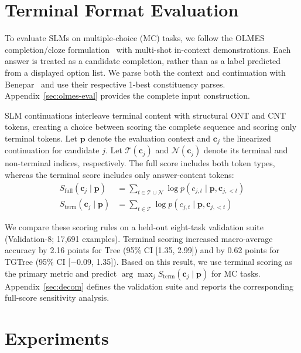 \documentclass[11pt]{article}
\begin{document}
\section{Terminal Format Evaluation}
\label{sec:terminal-format-evaluation}

To evaluate SLMs on multiple-choice (MC) tasks, we follow the OLMES completion/cloze formulation~\cite{gu-etal-2025-olmes} with multi-shot in-context demonstrations.
Each answer is treated as a candidate completion, rather than as a label predicted from a displayed option list.
We parse both the context and continuation with Benepar~\cite{kitaev-klein-2018-constituency} and use their respective 1-best constituency parses.
Appendix~\ref{sec:olmes-eval} provides the complete input construction.

SLM continuations interleave terminal content with structural ONT and CNT tokens, creating a choice between scoring the complete sequence and scoring only terminal tokens.
Let $\mathbf{p}$ denote the evaluation context and $\mathbf{c}_j$ the linearized continuation for candidate $j$.
Let $\mathcal{T}(\mathbf{c}_j)$ and $\mathcal{N}(\mathbf{c}_j)$ denote its terminal and non-terminal indices, respectively.
The full score includes both token types, whereas the terminal score includes only answer-content tokens:
\begin{align}
S_{\text{full}}(\mathbf{c}_j \mid \mathbf{p}) &= \sum_{t \in \mathcal{T} \cup \mathcal{N}} \log p(c_{j,t} \mid \mathbf{p}, \mathbf{c}_{j,<t}) \\
S_{\text{term}}(\mathbf{c}_j \mid \mathbf{p}) &= \sum_{t \in \mathcal{T}} \log p(c_{j,t} \mid \mathbf{p}, \mathbf{c}_{j,<t})
\label{eq:decom}
\end{align}

We compare these scoring rules on a held-out eight-task validation suite (Validation-8; 17,691 examples).
Terminal scoring increased macro-average accuracy by 2.16 points for Tree (95\% CI [1.35, 2.99]) and by 0.62 points for TGTree (95\% CI [$-$0.09, 1.35]).
Based on this result, we use terminal scoring as the primary metric and predict $\arg\max_j S_{\mathrm{term}}(\mathbf{c}_j \mid \mathbf{p})$ for MC tasks.
Appendix~\ref{sec:decom} defines the validation suite and reports the corresponding full-score sensitivity analysis.


\section{Experiments}
\end{document}

